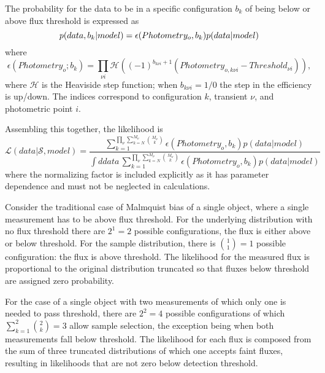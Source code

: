 \documentclass[preprint,3p]{elsarticle}
\begin{document}
The probability for the data to be in a specific configuration $b_k$ of
being below or above flux threshold is expressed
as
\begin{equation}
p(data, b_k| model)  = \epsilon(Photometry_o, b_k)p(data| model)\\
\end{equation}
where
\begin{equation}
\epsilon(Photometry_o; b_{k})= \prod_{\nu i}\mathcal{H}\left((-1)^{b_{k\nu i}+1}(Photometry_{o,k\nu i}-Threshold_{\nu i})\right),
\label{eff:eqn}
\end{equation}
where $\mathcal{H}$ is the Heaviside step function; when $b_{k\nu i}=1/0$ the step in the efficiency
is up/down.  The indices correspond to configuration $k$,
transient $\nu$, and photometric point $i$.

Assembling this together, the likelihood is
\begin{equation}
\mathcal{L}(data|\mathcal{S}, model) = \frac{\sum_{k=1}^{\prod_\nu \sum_{k=N}^{M_{\nu}} \binom{M_{\nu}}{k}} \epsilon(Photometry_o, b_k)p(data| model)}{\int ddata\,
\sum_{k=1}^{\prod_\nu \sum_{k=N}^{M_{\nu}} \binom{M_{\nu}}{k}} \epsilon(Photometry_o, b_k)p(data| model)
}
\end{equation}
where the normalizing factor is included explicitly as it has 
parameter dependence and must not be neglected in calculations.

Consider the traditional case of Malmquist bias of a single object,
where a single measurement has
to be above flux threshold.  For the underlying distribution with no flux threshold there
are $2^1=2$ possible configurations, the flux is either above or below threshold.  For
the sample distribution, there is $\binom{1}{1}=1$ possible configuration: the flux
is above threshold.   The likelihood for the measured flux is proportional to the original
distribution truncated so that fluxes below threshold are assigned zero probability.

For the case of a single object with two measurements of which only one is needed to
pass threshold,
there are $2^2=4$ possible configurations of which $\sum_{k=1}^{2} \binom{2}{k}=3$
allow sample selection, the exception being when both measurements fall below threshold.
The likelihood for each flux is composed from
the sum of three truncated distributions of which one accepts faint fluxes,
resulting in likelihoods that are not zero below detection threshold.
\end{document}
